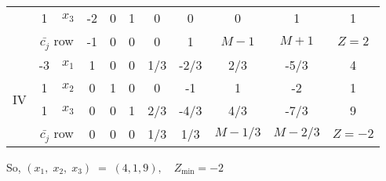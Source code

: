 \documentclass[../main-sheet.tex]{subfiles}
\begin{document}
\begin{soln}
\begin{table}[H]
\begin{tabular}{ccccccccccc}
                                    & 1                                     & $x_3$                                          & \cellcolor[rgb]{ 1,  .8,  .788}-2  & 0                                  & 1                                  & 0                                & 0                                 & 0                                & 1                                 & 1         \\
            \cmidrule{2-11}         & \multicolumn{2}{c}{$ \bar{c_j} $ row} & -1                                             & 0                                  & 0                                  & 0                                  & 1                                & \(M-1\)                               & \(M+1\)                              & \(Z=2\)                                           \\
            \midrule
            \multirow{4}[4]{*}{IV}  & -3                                    & $x_1$                                          & 1                                  & 0                                  & 0                                  & 1/3                              & -2/3                              & 2/3                              & -5/3                              & 4         \\
                                    & 1                                     & $ x_2$                                         & 0                                  & 1                                  & 0                                  & 0                                & -1                                & 1                                & -2                                & 1         \\
                                    & 1                                     & $x_3$                                          & 0                                  & 0                                  & 1                                  & 2/3                              & -4/3                              & 4/3                              & -7/3                              & 9         \\
            \cmidrule{2-11}         & \multicolumn{2}{c}{$ \bar{c_j} $ row} & 0                                              & 0                                  & 0                                  & 1/3                                & 1/3                              & \(M-1/3\)                             & \(M-2/3\)                            & \(Z=-2\)                                          \\
            \bottomrule
        \end{tabular}%
        \label{tab:addlabel}%
    \end{table}%
    So, \((x_1,\;x_2,\;x_3)\;=\;(4,1,9),\quad Z_{\text{min}}=-2\)
\end{soln}
\end{document}
